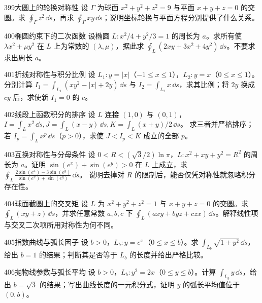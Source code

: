 \begin{exercise}{399}{大圆上的轮换对称性}
设 $\Gamma$ 为球面 $x^2+y^2+z^2=9$ 与平面 $x+y+z=0$ 的交圆。求 $\oint_\Gamma z^2\,\dd s$，再求 $\oint_\Gamma xy\,\dd s$；说明坐标轮换与平面方程分别提供了什么关系。
\end{exercise}

\begin{exercise}{400}{椭圆约束下的二次函数}
设椭圆 $L:x^2/4+y^2/3=1$ 的周长为 $a$。求所有使 $\lambda x^2+\mu y^2$ 在 $L$ 上为常数的 $(\lambda,\mu)$，据此求 $\oint_L(2xy+3x^2+4y^2)\,\dd s$。不要求求出周长 $a$。
\end{exercise}

\begin{exercise}{401}{折线对称性与积分比例}
设 $L_1:y=|x|$（$-1\leq x\leq1$），$L_2:y=x$（$0\leq x\leq1$）。分别计算
$I_1=\int_{L_1}(xy^2-|x|+2y)\,\dd s$ 与 $I_2=\int_{L_2}x\,\dd s$，求其比例；将 $2y$ 换成 $cy$ 后，求使新 $I_1=0$ 的 $c$。
\end{exercise}

\begin{exercise}{402}{线段上函数积分的排序}
设 $L$ 连接 $(1,0)$ 与 $(0,1)$，
$I=\int_Lx^2\,\dd s,J=\int_L(x-y)\,\dd s,K=\int_L(x+y)/2\,\dd s$。
求三者并严格排序；若 $I_p=\int_Lx^p\,\dd s$（$p>0$），求使 $J<I_p<K$ 成立的全部 $p$。
\end{exercise}

\begin{exercise}{403}{互换对称性与分母条件}
设 $0<R<(\sqrt3/2)\ln\pi$，$L:x^2+xy+y^2=R^2$ 的周长为 $a$。证明 $\sin(e^x)+\sin(e^y)>0$ 在 $L$ 上成立，求
$\oint_L\frac{2\sin(e^x)-3\sin(e^y)}{\sin(e^x)+\sin(e^y)}\,\dd s$。
说明去掉对 $R$ 的限制后，能否仅凭对称性就忽略积分存在性。
\end{exercise}

\begin{exercise}{404}{球面截圆上的交叉矩}
设 $L$ 为 $x^2+y^2+z^2=1$ 与 $x+y+z=0$ 的交圆。求 $\oint_L(xy+z)\,\dd s$，并求任意常数 $a,b,c$ 下 $\oint_L(ax y+byz+czx)\,\dd s$。解释线性项与交叉二次项所用对称性为何不同。
\end{exercise}

\begin{exercise}{405}{指数曲线与弧长因子}
设 $b>0$，$L_b:y=e^x$（$0\leq x\leq b$）。求 $\int_{L_b}\sqrt{1+y^2}\,\dd s$，给出 $b=1$ 的结果；判断其是否等于 $L_b$ 的长度并给出严格比较。
\end{exercise}

\begin{exercise}{406}{抛物线参数与弧长平均}
设 $b>0$，$L_b:y^2=2x$（$0\leq y\leq b$）。计算 $\int_{L_b}y\,\dd s$，给出 $b=\sqrt3$ 的结果；写出曲线长度的一元积分式，证明 $y$ 的弧长平均值位于 $(0,b)$。
\end{exercise}

